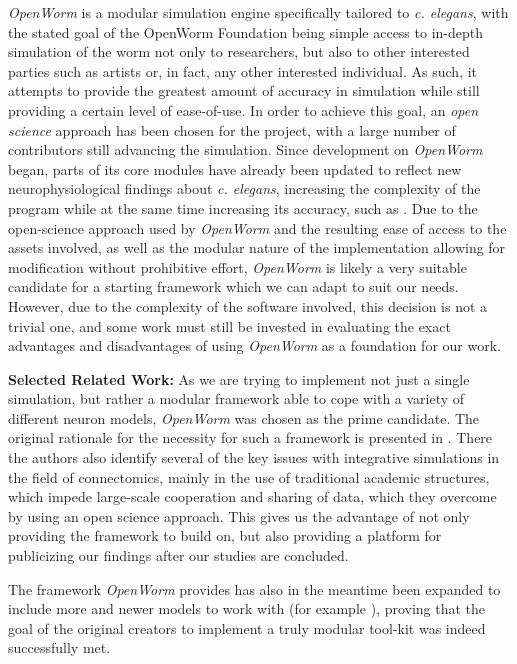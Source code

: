 \documentclass[a4paper,11pt]{article}
\begin{document}
\emph{OpenWorm} is a modular simulation engine specifically tailored to \emph{c. elegans}, with the stated goal of the OpenWorm Foundation being simple access to in-depth simulation of the worm not only to researchers, but also to other interested parties such as artists or, in fact, any other interested individual. As such, it attempts to provide the greatest amount of accuracy in simulation while still providing a certain level of ease-of-use. In order to achieve this goal, an \emph{open science}  approach has been chosen for the project, with a large number of contributors still advancing the simulation. Since development on \emph{OpenWorm} began, parts of its core modules have already been updated to reflect new neurophysiological findings about \emph{c. elegans}, increasing the complexity of the program while at the same time increasing its accuracy, such as \citep{M.2013}.
Due to the open-science approach used by \emph{OpenWorm} and the resulting ease of access to the assets involved, as well as the modular nature of the implementation allowing for modification without prohibitive effort, \emph{OpenWorm} is likely a very suitable candidate for a starting framework which we can adapt to suit our needs.
However, due to the complexity of the software involved, this decision is not a trivial one, and some work must still be invested in evaluating the exact advantages and disadvantages of using \emph{OpenWorm} as a foundation for our work. 

\textbf{Selected Related Work:}
As we are trying to implement not just a single simulation, but rather a modular framework able to cope with a variety of different neuron models, \emph{OpenWorm} was chosen as the prime candidate. The original rationale for the necessity for such a framework is presented in \citep{Szigeti2014}. There the authors also identify several of the key issues with integrative simulations in the field of connectomics, mainly in the use of traditional academic structures, which impede large-scale cooperation and sharing of data, which they overcome by using an open science approach. This gives us the advantage of not only providing the framework to build on, but also providing a platform for publicizing our findings after our studies are concluded.

The framework \emph{OpenWorm} provides has also in the meantime been expanded to include more and newer models to work with (for example \citep{M.2013}), proving that the goal of the original creators to implement a truly modular tool-kit was indeed successfully met.
\end{document}
